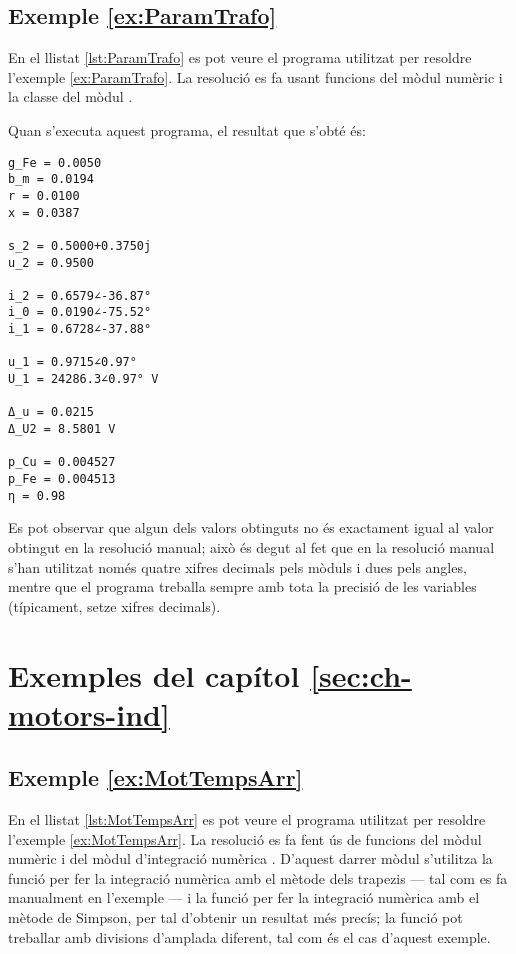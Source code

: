 \hypertarget{exemple:ParamTrafo}{\subsection{Exemple \ref*{ex:ParamTrafo} \ParamTrafo}}
En el llistat \vref{lst:ParamTrafo} es pot veure el programa utilitzat per resoldre l'exemple \vref{ex:ParamTrafo}. La resolució es fa usant funcions del mòdul numèric  i la classe   del mòdul .


Quan s'executa aquest programa, el resultat que s'obté és:
\lstset{
	language=,
	numbers=none,
	frame=none
}
\begin{lstlisting}
g_Fe = 0.0050
b_m = 0.0194
r = 0.0100
x = 0.0387

s_2 = 0.5000+0.3750j
u_2 = 0.9500

i_2 = 0.6579∠-36.87°
i_0 = 0.0190∠-75.52°
i_1 = 0.6728∠-37.88°

u_1 = 0.9715∠0.97°
U_1 = 24286.3∠0.97° V

Δ_u = 0.0215
Δ_U2 = 8.5801 V

p_Cu = 0.004527
p_Fe = 0.004513
η = 0.98
\end{lstlisting} 

Es pot observar que algun dels valors obtinguts no és exactament igual al valor obtingut en la resolució manual; això és degut al fet que en la resolució manual s'han utilitzat només quatre xifres decimals pels mòduls i dues pels angles, mentre que el programa treballa sempre amb tota la precisió de les variables (típicament, setze xifres decimals).




\section{Exemples del capítol \ref*{sec:ch-motors-ind}}

\hypertarget{exemple:MotTempsArr}{\subsection{Exemple \ref*{ex:MotTempsArr} \MotTempsArr}}
En el llistat \vref{lst:MotTempsArr} es pot veure el programa utilitzat per resoldre l'exemple \vref{ex:MotTempsArr}. La resolució es fa fent ús de funcions del mòdul numèric  i del mòdul d'integració numèrica . D'aquest darrer mòdul s'utilitza la funció  per fer la integració numèrica amb el mètode dels trapezis --- tal com es fa manualment en l'exemple --- i la funció  per fer la integració numèrica amb el mètode de Simpson, per tal d'obtenir un resultat més precís; la funció  pot treballar amb divisions d'amplada diferent, tal com és el cas d'aquest exemple. 


